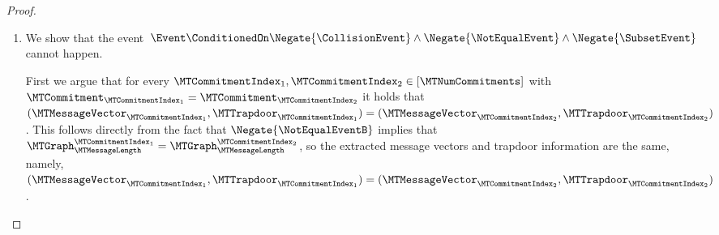 \begin{proof}
\begin{enumerate}
Since $\Negate{\NotEqualEvent}$ (and thus $\Negate{\NotEqualEventA}$), there are no queries in $\ROTrace'$ with an answer that equals a non-dummy label in $\MTGraph_{\MTMessageLength}^{\MTCommitmentIndex}$. Recall that $\ROHonestTrace_{\MTMessageIndexAlt}$ has length $\MTDepth+1$. Taking a union bound over all queries in $\ROHonestTrace_{\MTMessageIndexAlt}$, the probability that there exists a query in $\ROHonestTrace_{\MTMessageIndexAlt}$ (that is not in $\ROTrace \cup \ROOpenTrace$) with an answer that equals a non-dummy label in $\MTGraph_{\MTMessageLength}^{\MTCommitmentIndex}$ is at most $(\MTDepth+1) \cdot \frac{\min\{3\ROQueryBound_{1},2\MTMessageLength\}}{2^{\ROOutputSize}}$.

Hence
\begin{align*}
\Pr\left[\SubsetEvent \ConditionedOn \Negate{\CollisionEvent} \land \Negate{\NotEqualEvent} \right]
\leq
(\MTDepth+1) \cdot \frac{\min\{3\ROQueryBound_{1},2\MTMessageLength\}}{2^{\ROOutputSize}}
\enspace.
\end{align*}

  \item We show that the event $\left.\Event \ConditionedOn \Negate{\CollisionEvent} \land \Negate{\NotEqualEvent} \land \Negate{\SubsetEvent}\right.$ cannot happen.

First we argue that for every $\MTCommitmentIndex_{1},\MTCommitmentIndex_{2} \in [\MTNumCommitments]$ with $\MTCommitment_{\MTCommitmentIndex_{1}} = \MTCommitment_{\MTCommitmentIndex_{2}}$ it holds that $(\MTMessageVector_{\MTCommitmentIndex_{1}},\MTTrapdoor_{\MTCommitmentIndex_{1}}) = (\MTMessageVector_{\MTCommitmentIndex_{2}},\MTTrapdoor_{\MTCommitmentIndex_{2}})$. This follows directly from the fact that $\Negate{\NotEqualEventB}$ implies that $\MTGraph_{\MTMessageLength}^{\MTCommitmentIndex_{1}} = \MTGraph_{\MTMessageLength}^{\MTCommitmentIndex_{2}}$, so the extracted message vectors and trapdoor information are the same, namely, $(\MTMessageVector_{\MTCommitmentIndex_{1}},\MTTrapdoor_{\MTCommitmentIndex_{1}}) = (\MTMessageVector_{\MTCommitmentIndex_{2}},\MTTrapdoor_{\MTCommitmentIndex_{2}})$.


\end{enumerate}
\end{proof}
